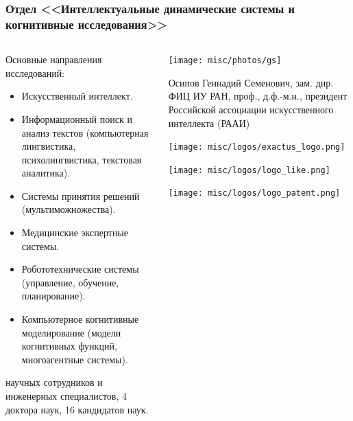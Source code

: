 	\begin{frame}
		\frametitle{Отдел <<Интеллектуальные динамические системы и когнитивные исследования>>}
		
		\begin{columns}
			\begin{column}{0.7\textwidth}
				Основные направления исследований:
				\begin{itemize}
					\item Искусственный интеллект.
					\item Информационный поиск и анализ текстов (компьютерная лингвистика, психолингвистика, текстовая аналитика).
					\item Системы принятия решений (мультиможножества).
					\item Медицинские экспертные системы.
					\item Робототехнические системы (управление, обучение, планирование).
					\item Компьютерное когнитивные моделирование (модели когнитивных функций, многоагентные системы).
				\end{itemize}
				\par{} научных сотрудников и инженерных специалистов, 4 доктора наук, 16 кандидатов наук.
			\end{column}
			\begin{column}{0.3\textwidth}
				\centering
				\texttt{[image: misc/photos/gs]}
				\par\smallskip
				\tiny
				Осипов Геннадий Семенович, зам. дир. ФИЦ ИУ РАН, проф., д.ф.-м.н., президент Российской ассоциации искусственного интеллекта (РААИ)
				\par\medskip
				\texttt{[image: misc/logos/exactus\_logo.png]}
				\par\medskip
				\texttt{[image: misc/logos/logo\_like.png]}
				\par\medskip
				\texttt{[image: misc/logos/logo\_patent.png]}

			\end{column}
		\end{columns}
	\end{frame}

